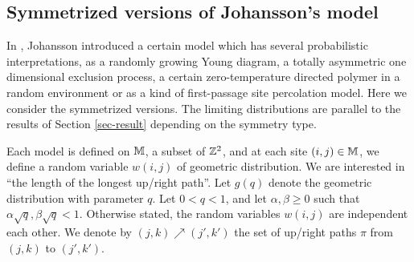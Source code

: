 \subsection{Symmetrized versions of Johansson's model}\label{subsec-Jo}

In \cite{kurtj:shape}, Johansson introduced a certain model 
which has several probabilistic interpretations, 
as a randomly growing Young diagram, a totally asymmetric one dimensional 
exclusion process, a certain zero-temperature directed polymer in a random 
environment or as a kind of first-passage site percolation model.
Here we consider the symmetrized versions.
The limiting distributions are parallel to the results of Section 
\ref{sec-result} depending on the symmetry type.

Each model is defined on $\mathbb M$, a subset of $\mathbb Z^2$, and at each site 
$(i,j)\in\mathbb M$, we define a random variable $w(i,j)$ of geometric
distribution. 
We are interested in ``the length of the longest up/right path''.
Let $g(q)$ denote the geometric distribution with parameter $q$.
Let $0<q<1$, and let $\alpha,\beta\ge 0$ such that 
$\alpha \sqrt{q}, \beta \sqrt{q}<1$.
Otherwise stated, the random variables $w(i,j)$ are independent each other.
We denote by $(j,k)\nearrow (j',k')$ the set of up/right paths $\pi$ from 
$(j,k)$ to $(j',k')$.

